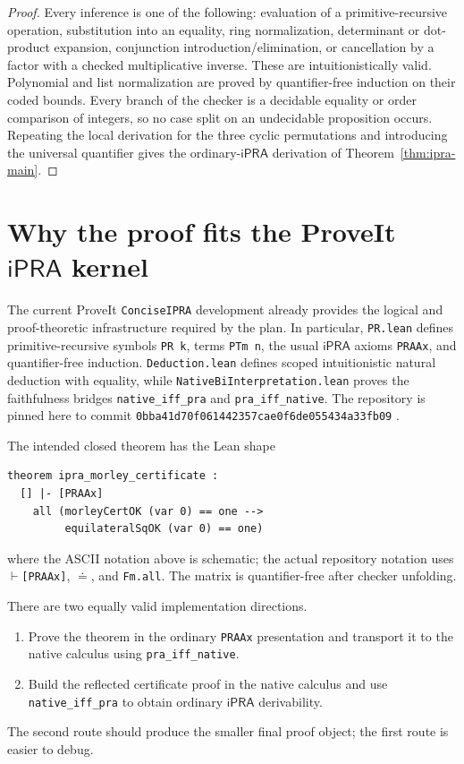 \documentclass[11pt]{article}
\theoremstyle{definition}
\newcommand{\iPRA}{\mathsf{iPRA}}
\newcommand{\code}[1]{\texttt{#1}}
\begin{document}
\begin{proof}
Every inference is one of the following: evaluation of a primitive-recursive
operation, substitution into an equality, ring normalization, determinant or
dot-product expansion, conjunction introduction/elimination, or cancellation
by a factor with a checked multiplicative inverse.  These are intuitionistically valid.  Polynomial and list normalization are
proved by quantifier-free induction on their coded bounds.  Every branch of the
checker is a decidable equality or order comparison of integers, so no case
split on an undecidable proposition occurs.  Repeating the local derivation
for the three cyclic permutations and introducing the universal quantifier
gives the ordinary-$\iPRA$ derivation of Theorem~\ref{thm:ipra-main}.
\end{proof}



\section{Why the proof fits the ProveIt \texorpdfstring{$\iPRA$}{iPRA} kernel}

The current ProveIt \code{ConciseIPRA} development already provides the
logical and proof-theoretic infrastructure required by the plan.  In
particular, \code{PR.lean} defines primitive-recursive symbols \code{PR k},
terms \code{PTm n}, the usual $\iPRA$ axioms \code{PRAAx}, and quantifier-free
induction.  \code{Deduction.lean} defines scoped intuitionistic natural
deduction with equality, while \code{NativeBiInterpretation.lean} proves the
faithfulness bridges \code{native\_iff\_pra} and \code{pra\_iff\_native}.
The repository is pinned here to commit
\code{0bba41d70f061442357cae0f6de055434a33fb09} \cite{ProveIt}.

The intended closed theorem has the Lean shape
\begin{lstlisting}[language=Lean]
theorem ipra_morley_certificate :
  [] |- [PRAAx]
    all (morleyCertOK (var 0) == one -->
         equilateralSqOK (var 0) == one)
\end{lstlisting}
where the ASCII notation above is schematic; the actual repository notation
uses \code{\ensuremath{\vdash}[PRAAx]}, \code{\ensuremath{\doteq}}, and
\code{Fm.all}.  The matrix is quantifier-free after checker unfolding.

There are two equally valid implementation directions.
\begin{enumerate}
\item Prove the theorem in the ordinary \code{PRAAx} presentation and transport
it to the native calculus using \code{pra\_iff\_native}.
\item Build the reflected certificate proof in the native calculus and use
\code{native\_iff\_pra} to obtain ordinary $\iPRA$ derivability.
\end{enumerate}
The second route should produce the smaller final proof object; the first route
is easier to debug.
\end{document}
